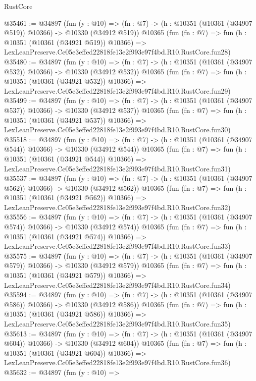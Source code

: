 \begin{lexlean}{RustCore}
\begin{coremodule}
@35461 := @34897
    (fun (y : @10) =>
    (fn : @7) -> (h : @10351 (@10361 (@34907 @519)) @10366) -> @10330 (@34912 @519))
    @10365
    (fun (fn : @7) =>
    fun (h : @10351 (@10361 (@34921 @519)) @10366) =>
    LexLeanPreserve.Cc05e3effed22818fe13e2f993e97f4bd.R10.RustCore.fun28)
@35480 := @34897
    (fun (y : @10) =>
    (fn : @7) -> (h : @10351 (@10361 (@34907 @532)) @10366) -> @10330 (@34912 @532))
    @10365
    (fun (fn : @7) =>
    fun (h : @10351 (@10361 (@34921 @532)) @10366) =>
    LexLeanPreserve.Cc05e3effed22818fe13e2f993e97f4bd.R10.RustCore.fun29)
@35499 := @34897
    (fun (y : @10) =>
    (fn : @7) -> (h : @10351 (@10361 (@34907 @537)) @10366) -> @10330 (@34912 @537))
    @10365
    (fun (fn : @7) =>
    fun (h : @10351 (@10361 (@34921 @537)) @10366) =>
    LexLeanPreserve.Cc05e3effed22818fe13e2f993e97f4bd.R10.RustCore.fun30)
@35518 := @34897
    (fun (y : @10) =>
    (fn : @7) -> (h : @10351 (@10361 (@34907 @544)) @10366) -> @10330 (@34912 @544))
    @10365
    (fun (fn : @7) =>
    fun (h : @10351 (@10361 (@34921 @544)) @10366) =>
    LexLeanPreserve.Cc05e3effed22818fe13e2f993e97f4bd.R10.RustCore.fun31)
@35537 := @34897
    (fun (y : @10) =>
    (fn : @7) -> (h : @10351 (@10361 (@34907 @562)) @10366) -> @10330 (@34912 @562))
    @10365
    (fun (fn : @7) =>
    fun (h : @10351 (@10361 (@34921 @562)) @10366) =>
    LexLeanPreserve.Cc05e3effed22818fe13e2f993e97f4bd.R10.RustCore.fun32)
@35556 := @34897
    (fun (y : @10) =>
    (fn : @7) -> (h : @10351 (@10361 (@34907 @574)) @10366) -> @10330 (@34912 @574))
    @10365
    (fun (fn : @7) =>
    fun (h : @10351 (@10361 (@34921 @574)) @10366) =>
    LexLeanPreserve.Cc05e3effed22818fe13e2f993e97f4bd.R10.RustCore.fun33)
@35575 := @34897
    (fun (y : @10) =>
    (fn : @7) -> (h : @10351 (@10361 (@34907 @579)) @10366) -> @10330 (@34912 @579))
    @10365
    (fun (fn : @7) =>
    fun (h : @10351 (@10361 (@34921 @579)) @10366) =>
    LexLeanPreserve.Cc05e3effed22818fe13e2f993e97f4bd.R10.RustCore.fun34)
@35594 := @34897
    (fun (y : @10) =>
    (fn : @7) -> (h : @10351 (@10361 (@34907 @586)) @10366) -> @10330 (@34912 @586))
    @10365
    (fun (fn : @7) =>
    fun (h : @10351 (@10361 (@34921 @586)) @10366) =>
    LexLeanPreserve.Cc05e3effed22818fe13e2f993e97f4bd.R10.RustCore.fun35)
@35613 := @34897
    (fun (y : @10) =>
    (fn : @7) -> (h : @10351 (@10361 (@34907 @604)) @10366) -> @10330 (@34912 @604))
    @10365
    (fun (fn : @7) =>
    fun (h : @10351 (@10361 (@34921 @604)) @10366) =>
    LexLeanPreserve.Cc05e3effed22818fe13e2f993e97f4bd.R10.RustCore.fun36)
@35632 := @34897
    (fun (y : @10) =>

\end{coremodule}
\end{lexlean}
